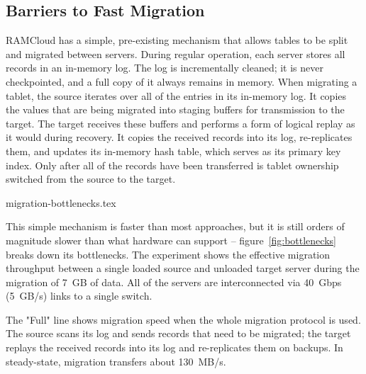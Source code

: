 \subsection{Barriers to Fast Migration}
\label{sec:bottlenecks}

RAMCloud has a simple, pre-existing mechanism that allows tables to be split
and migrated between servers.
During regular operation, each server stores
all records in an in-memory log. The log is incrementally cleaned; it is
never checkpointed, and a full copy of it always remains in memory.
When migrating a tablet,
the source iterates over all of the entries in its
in-memory log. It copies the values that are being migrated into staging buffers for
transmission to the target. The target receives these buffers and performs a
form of logical replay as it would during recovery. It copies the received
records into its log, re-replicates them, and updates its in-memory hash
table, which serves as its primary key index. Only after all of the records
have been transferred is tablet ownership switched from the source to
the target.

 {migration-bottlenecks.tex}

This simple mechanism is faster than most
approaches,
but it is still orders of
magnitude slower than what hardware can support -- figure~\ref{fig:bottlenecks}
breaks down its bottlenecks. The
experiment shows the effective migration throughput between a single loaded
source and unloaded target server during the migration of
7~GB of data.  All of the servers are interconnected via 40~Gbps (5~GB/s) links
to a single switch.

The "Full" line shows migration speed when the whole migration
protocol is used. The source scans its log and sends records that need to
be migrated; the target replays the received records into its log and
re-replicates them on backups.
In steady-state, migration transfers about 130~MB/s.

